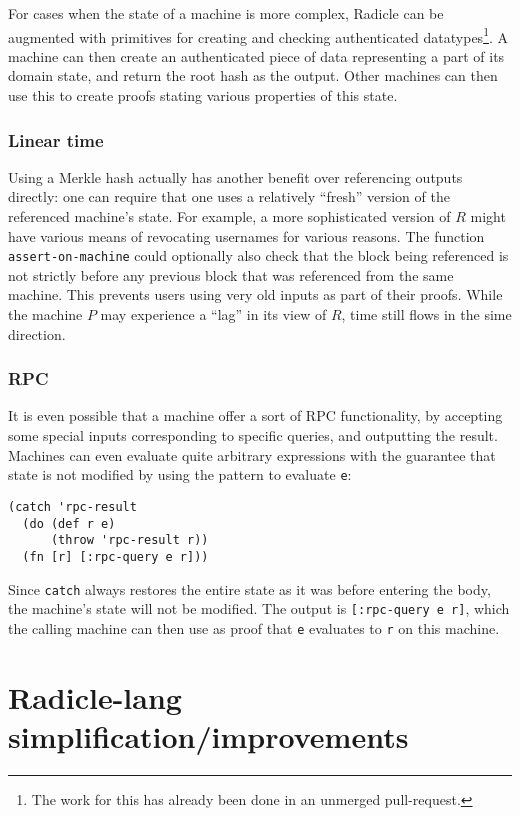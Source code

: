\documentclass[a4paper, oneside, 10pt]{amsart}
\begin{document}
For cases when the state of a machine is more complex, Radicle can be augmented
with primitives for creating and checking authenticated datatypes\footnote{The
  work for this has already been done in an unmerged pull-request.}. A machine
can then create an authenticated piece of data representing a part of its domain
state, and return the root hash as the output. Other machines can then use this
to create proofs stating various properties of this state.

\subsubsection{Linear time}

Using a Merkle hash actually has another benefit over referencing outputs
directly: one can require that one uses a relatively ``fresh'' version of the
referenced machine's state. For example, a more sophisticated version of $R$
might have various means of revocating usernames for various reasons. The
function \texttt{assert-on-machine} could optionally also check that the block
being referenced is not strictly before any previous block that was referenced
from the same machine. This prevents users using very old inputs as part of
their proofs. While the machine $P$ may experience a ``lag'' in its view of $R$,
time still flows in the sime direction.

\subsubsection{RPC}

It is even possible that a machine offer a sort of RPC functionality, by
accepting some special inputs corresponding to specific queries, and outputting
the result. Machines can even evaluate quite arbitrary expressions with the
guarantee that state is not modified by using the pattern to evaluate
\texttt{e}:
\begin{verbatim}
(catch 'rpc-result
  (do (def r e)
      (throw 'rpc-result r))
  (fn [r] [:rpc-query e r]))
\end{verbatim}
Since \texttt{catch} always restores the entire state as it was before entering
the body, the machine's state will not be modified. The output is
\texttt{[:rpc-query e r]}, which the calling machine can then use as proof that
\texttt{e} evaluates to \texttt{r} on this machine.

\section{Radicle-lang simplification/improvements}\label{radicle-lang-simplificationimprovements}
\end{document}
